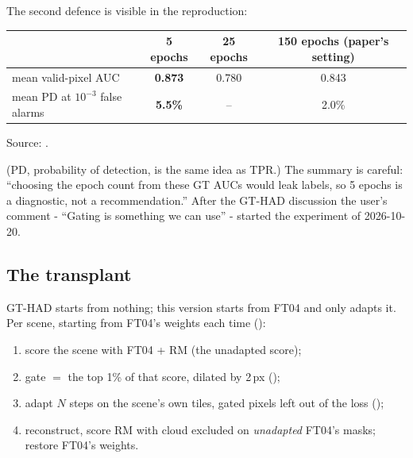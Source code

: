 The second defence is visible in the reproduction:
\begin{center}
\small
\begin{tabular}{lccc}
\toprule
 & 5 epochs & 25 epochs & 150 epochs (paper's setting) \\
\midrule
mean valid-pixel AUC & \textbf{0.873} & 0.780 & 0.843 \\
mean PD at $10^{-3}$ false alarms & \textbf{5.5\%} & -- & 2.0\% \\
\bottomrule
\end{tabular}

\smallskip
{\footnotesize Source: .}
\end{center}
(PD, probability of detection, is the same idea as TPR.) The summary is careful: ``choosing the epoch count from these GT
AUCs would leak labels, so 5 epochs is a diagnostic, not a recommendation.'' After the GT-HAD discussion the user's comment -
``Gating is something we can use'' - started the experiment of 2026-10-20.

\subsection{The transplant}

GT-HAD starts from nothing; this version starts from FT04 and only adapts it. Per scene, starting from FT04's weights each
time ():
\begin{enumerate}
\item score the scene with FT04 + RM (the unadapted score);
\item gate $=$ the top 1\% of that score, dilated by 2\,px ();
\item adapt $N$ steps on the scene's own tiles, gated pixels left out of the loss ();
\item reconstruct, score RM with cloud excluded on \emph{unadapted} FT04's masks; restore FT04's weights.
\end{enumerate}

